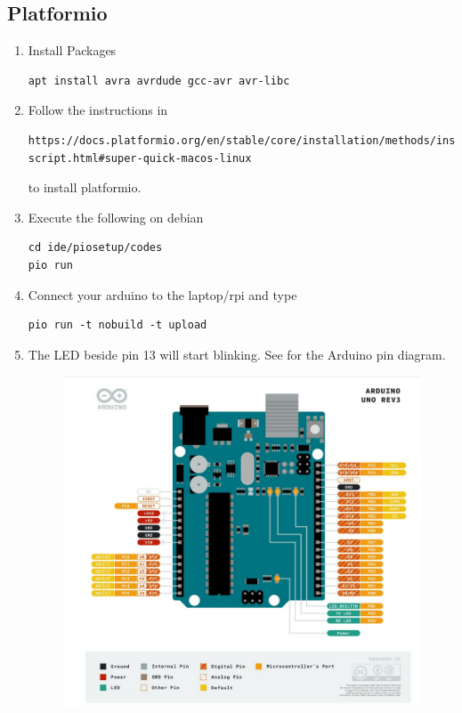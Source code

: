 \subsection{Platformio }
\begin{enumerate}[label=\arabic*.,ref=\theenumi]
	\item Install Packages
\begin{lstlisting}
apt install avra avrdude gcc-avr avr-libc
\end{lstlisting}
\item Follow the instructions in 
\begin{lstlisting}
https://docs.platformio.org/en/stable/core/installation/methods/installer-script.html#super-quick-macos-linux
\end{lstlisting}
to install platformio.
\item Execute the following on debian
\begin{lstlisting}
cd ide/piosetup/codes
pio run
\end{lstlisting}
\item Connect your arduino to the  laptop/rpi and type
\begin{lstlisting}
pio run -t nobuild -t upload
\end{lstlisting}
\item The LED beside pin 13 will start
	blinking.  See  for the Arduino pin diagram.
		\begin{figure}[H]
	\centering
	\includegraphics[width=0.75\columnwidth]{figs/arduino.jpg}
	\caption{}
	\label{fig:arduino}
\end{figure}

\end{enumerate}
